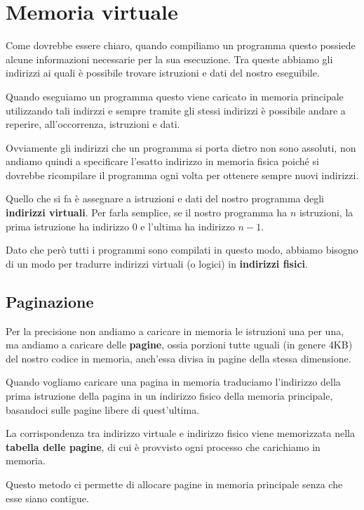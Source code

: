 \section{Memoria virtuale}
Come dovrebbe essere chiaro, quando compiliamo un programma questo possiede alcune informazioni
necessarie per la sua esecuzione. Tra queste abbiamo gli indirizzi ai quali è possibile trovare
istruzioni e dati del nostro eseguibile.

Quando eseguiamo un programma questo viene caricato in memoria principale utilizzando tali indirzzi
e sempre tramite gli stessi indirizzi è possibile andare a reperire, all'occorrenza, istruzioni e
dati.

Ovviamente gli indirizzi che un programma si porta dietro non sono assoluti, non andiamo quindi a
specificare l'esatto indirizzo in memoria fisica poiché si dovrebbe ricompilare il programma ogni
volta per ottenere sempre nuovi indirizzi.

Quello che si fa è assegnare a istruzioni e dati del nostro programma degli
\textbf{indirizzi virtuali}. Per farla semplice, se il nostro programma ha $n$ istruzioni, la prima
istruzione ha indirizzo 0 e l'ultima ha indirizzo $n-1$.

Dato che però tutti i programmi sono compilati in questo modo, abbiamo bisogno di un modo per
tradurre indirizzi virtuali (o logici) in \textbf{indirizzi fisici}.

\subsection{Paginazione}
Per la precisione non andiamo a caricare in memoria le istruzioni una per una, ma andiamo a caricare
delle \textbf{pagine}, ossia porzioni tutte uguali (in genere 4KB) del nostro codice in memoria,
anch'essa divisa in pagine della stessa dimensione.

Quando vogliamo caricare una pagina in memoria traduciamo l'indirizzo della prima istruzione della
pagina in un indirizzo fisico della memoria principale, basandoci sulle pagine libere di
quest'ultima.

La corrispondenza tra indirizzo virtuale e indirizzo fisico viene memorizzata nella
\textbf{tabella delle pagine}, di cui è provvisto ogni processo che carichiamo in memoria.
\begin{center}
	
\end{center}
Questo metodo ci permette di allocare pagine in memoria principale senza che esse siano contigue.

